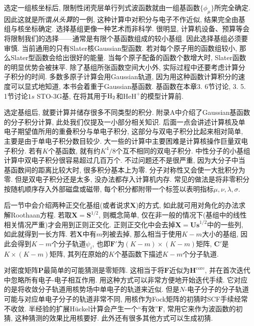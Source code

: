 选定一组核坐标后, 
限制性闭壳层单行列式波函数就由一组基函数$\{\phi_\mu\}$所完全确定. 
因此这就是所谓\emph{从头算}的一例, 
这种计算中对积分与电子\ha 不作近似, 
结果完全由基组与核坐标确定. 
选择基组更像一种艺术而非科学. 
很明显, 
计算机设备、预算等会将限制我们的选择——通常是有限个基函数组成的较小基组. 
因此选择基组必须要审慎. 
当前通用的只有Slater核Gaussian型函数. 
若对每个原子用的函数组较小, 
那么Slater型函数会给出很好的能量. 
当每个原子配备的函数个数增大时, 
Slater函数的明显优势会被抹平. 
除了基组所张函数空间大小外, 
实际过程中还要考虑计算分子积分的时间. 
多数多原子计算会用Gaussian轨道, 
因为用这种函数计算积分的速度可以显式地知道, 
本书会着重于Gaussian基函数. 
基函数在本章3.
6节讨论, 
3.
5.
1节讨论$1s$ STO-3G基, 
在将其用于$\mathrm{H}_2$和$\mathrm{HeH}^+$的模型计算前.


选定基组后, 
就要计算并储存很多不同类型的积分. 
附录A中介绍了Gaussian基函数的分子积分计算, 
此处我们仅提及一小部分相关知识. 
后面一点会讲述计算核\ha 及单电子期望值所用的重叠积分与单电子积分, 
这部分与双电子积分比起来相对简单, 
主要是由于单电子积分数目较少. 
大一些的计算中主要困难是计算核操作巨量双电子积分. 
若有$K$个基函数, 
就有约$K^4/8$个互不相同的双电子积分. 
中性分子的小基组计算中双电子积分很容易超过几百万个. 
不过问题还不是很严重, 
因为大分子中当基函数间的距离比较大时, 
很多积分基本上为零. 
分子对称性又会使一大批积分为零. 
但是双电子积分还是太多, 
没办法都存入计算机内存. 
常见的做法是将非零积分按随机顺序存入外部磁盘或磁带, 
每个积分都附带一个标签以表明指标$\mu,\nu,\lambda,\sigma$.


后一节中会介绍两种正交化基组(或者说求$\mathbf{X}$)的方式, 
如此就可用对角化的办法求解Roothaan方程. 
若取$\mathbf{X=S}^{1/2}$, 
则概念简单, 
仅在非一般的情况下(基组中的线性相关情况严重)才会用到正则正交化. 
正则正交化中会去掉$\mathbf{X=Us}^{1/2}$中的一些列, 
如此就得到一长方阵. 
若$\mathbf{X}$中有$m$列被去掉, 
那么相当于使用$K-m$大小的基组, 
因此会得到$K-m$个分子轨道$\psi_i$, 
也即$\mathbf{F'}$为$(K-m)\times(K-m)$矩阵, 
$\mathbf{C'}$是$K\times(K-m)$矩阵, 
其列在原始的$K$个基函数下描述$K-m$个分子轨道.


对密度矩阵$\mathbf{P}$最简单的可能猜测是零矩阵. 
这相当于将$\mathbf{F}$近似为$\mathbf{H}^\mathrm{core}$, 
并在首次迭代中忽略所有电子-电子相互作用. 
用这种方式可以非常方便地开始迭代手续. 
它对应的是将收敛分子轨道用核势场中单电子的轨道来近似. 
但是$N$-电子分子的分子轨道可能与对应单电子分子的轨道非常不同, 
用核\ha 作为Fock矩阵的初猜时SCF手续经常不收敛. 
半经验的扩展H\"uckel计算会产生一个``有效''$\mathbf{F}$, 
常用它来作为波函数的初猜, 
这种猜测的效果比用核\ha 要好. 
此外还有很多其他方式可以生成初猜.


